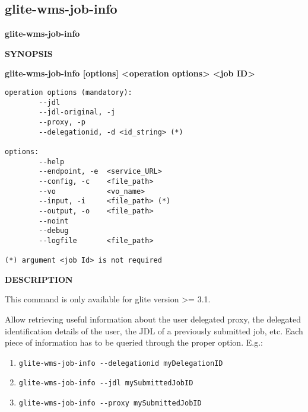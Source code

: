 
\subsection{glite-wms-job-info}
\label{glite-wms-job-info}

\medskip
\textbf{glite-wms-job-info}
\smallskip


\textbf{SYNOPSIS}
\smallskip

\textbf{glite-wms-job-info [options] <operation options> <job ID>}

\begin{verbatim}
operation options (mandatory):
        --jdl
        --jdl-original, -j
        --proxy, -p
        --delegationid, -d <id_string> (*)

options:
        --help
        --endpoint, -e  <service_URL>
        --config, -c    <file_path>
        --vo            <vo_name>
        --input, -i     <file_path> (*)
        --output, -o    <file_path>
        --noint
        --debug
        --logfile       <file_path>

(*) argument <job Id> is not required
\end{verbatim}

\medskip
\textbf{DESCRIPTION}
\smallskip

This command is only available for glite version >= 3.1.

Allow retrieving useful information about the user delegated proxy, the delegated identification details of the user, 
the JDL of a previously submitted job, etc.
Each piece of information has to be queried through the proper option.
E.g.:

\begin{enumerate}


\item  \begin{verbatim}
glite-wms-job-info --delegationid myDelegationID
\end{verbatim}


\item  \begin{verbatim}glite-wms-job-info --jdl mySubmittedJobID
\end{verbatim}


\item  \begin{verbatim}
glite-wms-job-info --proxy mySubmittedJobID
\end{verbatim}

\end{enumerate}




